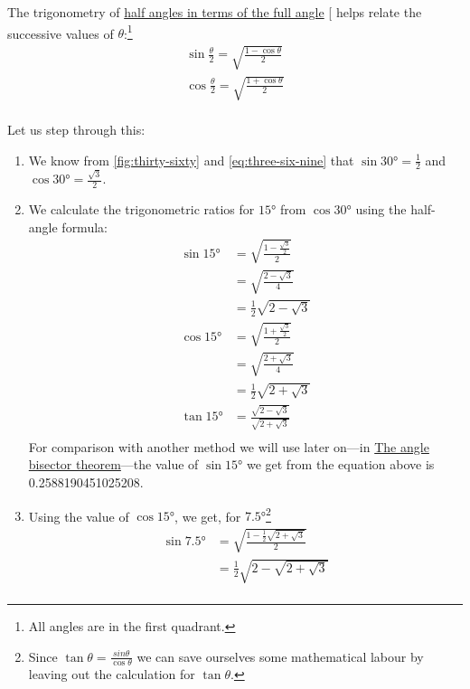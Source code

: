 \documentclass[
  a4paper,
]{article}
\begin{document}
The trigonometry of
\href{https://math.libretexts.org/Bookshelves/Algebra/Algebra_and_Trigonometry_1e_(OpenStax)/09:_Trigonometric_Identities_and_Equations/9.03:_Double-Angle_Half-Angle_and_Reduction_Formulas}{half
angles in terms of the full angle} {[}\citeproc{ref-half-angle}{4}{]}
helps relate the successive values of \(\theta\):\footnote{All angles
  are in the first quadrant.} \[
\begin{aligned}
\sin\frac{\theta}{2} = \sqrt{\frac{1 - \cos\theta}{2}}\\
\cos\frac{\theta}{2} = \sqrt{\frac{1 + \cos\theta}{2}}\\
\end{aligned}
\]

Let us step through this:

\begin{enumerate}
\item
  We know from \cref{fig:thirty-sixty} and \cref{eq:three-six-nine} that
  \(\sin 30° = \frac{1}{2}\) and \(\cos 30° = \frac{\sqrt{3}}{2}\).
\item
  We calculate the trigonometric ratios for \(15°\) from \(\cos 30°\)
  using the half-angle formula: \[
  \begin{aligned}
  \sin 15° &= \sqrt{\frac{1 - \frac{\sqrt{3}}{2}}{2}}\\
  &= \sqrt{\frac{2 - \sqrt{3}}{4}}\\
  &= \frac{1}{2}\sqrt{2 - \sqrt{3}}\\
  \cos 15° &= \sqrt{\frac{1 + \frac{\sqrt{3}}{2}}{2}}\\
  &= \sqrt{\frac{2 + \sqrt{3}}{4}}\\
  &= \frac{1}{2}\sqrt{2 + \sqrt{3}}\\
  \tan 15° &= \frac{\sqrt{2 - \sqrt{3}}}{\sqrt{2 + \sqrt{3}}}\\
  \end{aligned}
  \] For comparison with another method we will use later on---in
  \hyperref[the-angle-bisector-theorem]{The angle bisector
  theorem}---the value of \(\sin 15°\) we get from the equation above is
  0.2588190451025208.
\item
  Using the value of \(\cos 15°\), we get, for \(7.5°\)\footnote{Since
    \(\tan\theta = \frac{sin\theta}{\cos\theta}\) we can save ourselves
    some mathematical labour by leaving out the calculation for
    \(\tan\theta\).} \[
  \begin{aligned}
  \sin 7.5° &= \sqrt{\frac{1 - \frac{1}{2}\sqrt{2 + \sqrt{3}}}{2}}\\
  &= \frac{1}{2}\sqrt{2 - \sqrt{2 + \sqrt{3}}}\\

\end{aligned}\]
\end{enumerate}
\end{document}
